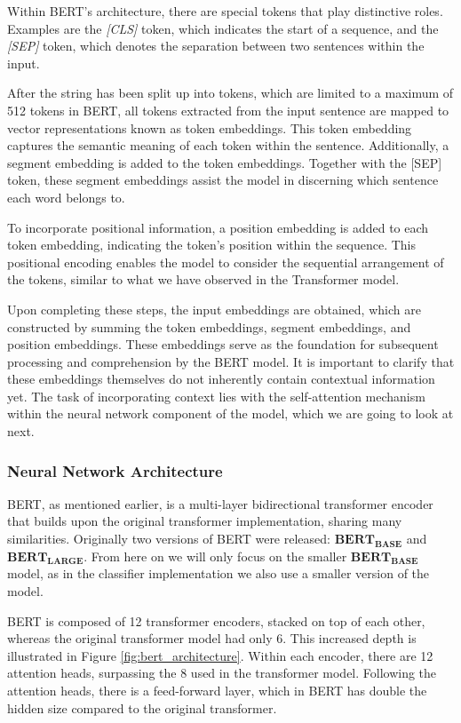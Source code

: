\documentclass[12pt,oneside,bibtotoc,liststotoc]{scrbook}
\begin{document}
Within BERT's architecture, there are special tokens that play distinctive roles. Examples are the \textit{[CLS]} token, which indicates the start of a sequence, and the \textit{[SEP]} token, which denotes the separation between two sentences within the input.

After the string has been split up into tokens, which are limited to a maximum of 512 tokens in BERT, all tokens extracted from the input sentence are mapped to vector representations known as token embeddings. This token embedding captures the semantic meaning of each token within the sentence. Additionally, a segment embedding is added to the token embeddings. Together with the [SEP] token, these segment embeddings assist the model in discerning which sentence each word belongs to.

To incorporate positional information, a position embedding is added to each token embedding, indicating the token's position within the sequence. This positional encoding enables the model to consider the sequential arrangement of the tokens, similar to what we have observed in the Transformer model.

Upon completing these steps, the input embeddings are obtained, which are constructed by summing the token embeddings, segment embeddings, and position embeddings. These embeddings serve as the foundation for subsequent processing and comprehension by the BERT model. It is important to clarify that these embeddings themselves do not inherently contain contextual information yet. The task of incorporating context lies with the self-attention mechanism within the neural network component of the model, which we are going to look at next. \cite{bert}

\subsubsection{Neural Network Architecture}
BERT, as mentioned earlier, is a multi-layer bidirectional transformer encoder that builds upon the original transformer implementation, sharing many similarities. Originally two versions of BERT were released: $\mathbf{BERT_{BASE}}$ and $\mathbf{BERT_{LARGE}}$. From here on we will only focus on the smaller $\mathbf{BERT_{BASE}}$ model, as in the classifier implementation we also use a smaller version of the model.

BERT is composed of 12 transformer encoders, stacked on top of each other, whereas the original transformer model had only 6. This increased depth is illustrated in Figure \ref{fig:bert_architecture}. Within each encoder, there are 12 attention heads, surpassing the 8 used in the transformer model. Following the attention heads, there is a feed-forward layer, which in BERT has double the hidden size compared to the original transformer.
\end{document}
